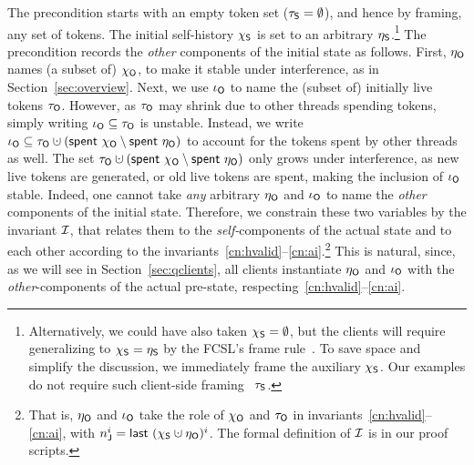 The precondition starts with an empty token set ($\tau_{\mathsf{S}} = \emptyset$),
and hence by framing, any set of tokens. The initial self-history
$\chi_{\mathsf{S}}$ is set to an arbitrary $\eta_{\mathsf{S}}$.\footnote{Alternatively, we
  could have also taken $\chi_{\mathsf{S}} = \emptyset$, but the clients will
  require generalizing to $\chi_{\mathsf{S}} = \eta_{\mathsf{S}}$ by the FCSL's frame
  rule~\cite{Sergey-al:ESOP15}. To save space and simplify the
  discussion, we immediately frame \wrt the auxiliary $\chi_{\mathsf{S}}$. Our
  examples do not require such client-side framing \wrt~$\tau_{\mathsf{S}}$.} The
precondition records the \emph{other} components of the initial state
as follows. First, $\eta_{\mathsf{O}}$ names (a subset of) $\chi_{\mathsf{O}}$, to make it
stable under interference, as in Section~\ref{sec:overview}. Next, we
use $\iota_{\mathsf{O}}$ to name the (subset of) initially live tokens
$\tau_{\mathsf{O}}$. However, as $\tau_{\mathsf{O}}$ may shrink due to other threads spending
tokens, simply writing $\iota_{\mathsf{O}} \subseteq \tau_{\mathsf{O}}$ is unstable. Instead,
we write $\ikno \subseteq \tkno \hunion (\Tomb~\histo \setminus
\Tomb~\gisto)$ to account for the tokens spent by other threads as
well. The set $\tkno \hunion (\Tomb~\histo \setminus \Tomb~\gisto)$
only grows under interference, as new live tokens are generated, or
old live tokens are spent, making the inclusion of $\iota_{\mathsf{O}}$ stable.
%
Indeed, one cannot take \emph{any} arbitrary $\eta_{\mathsf{O}}$ and $\iota_{\mathsf{O}}$ to
name the \emph{other} components of the initial state. Therefore, we
constrain these two variables by the invariant $\mathcal{I}$, that relates
them to the \emph{self-}components of the actual state and to each
other according to the
invariants~\ref{cn:hvalid}--\ref{cn:ai}.\footnote{That is, $\eta_{\mathsf{O}}$
  and $\iota_{\mathsf{O}}$ take the role of $\chi_{\mathsf{O}}$ and $\tau_{\mathsf{O}}$ in
  invariants~\ref{cn:hvalid}--\ref{cn:ai}, with
  $n^i_\joint = \last~(\hists \hunion \gisto)^i$. The formal
  definition of $\mathcal{I}$ is in our proof scripts.} This is natural,
since, as we will see in Section~\ref{sec:qclients}, all clients
instantiate $\eta_{\mathsf{O}}$ and $\iota_{\mathsf{O}}$ with the \emph{other}-components of
the actual pre-state, respecting~\ref{cn:hvalid}--\ref{cn:ai}.

%
%
%
%
%

